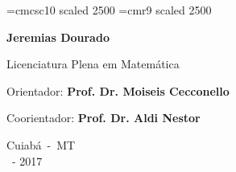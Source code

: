 \vspace{4cm} 

\font\fontGrande=cmcsc10 scaled 2500
\font\pessoal=cmr9 scaled 2500

\begin{center}
\end{center}

\begin{center}

\normalsize \vspace{3cm}

{\large {\bf Jeremias Dourado}}

{\footnotesize{Licenciatura Plena em Matem\'{a}tica}}

\vspace{3cm}

Orientador: {\bf Prof. Dr. Moiseis Cecconello}

Coorientador: {\bf Prof. Dr. Aldi Nestor}


\vspace{4cm}

{\footnotesize{Cuiab\'a~-~MT\\\mes \ - 2017}}
\end{center}

%